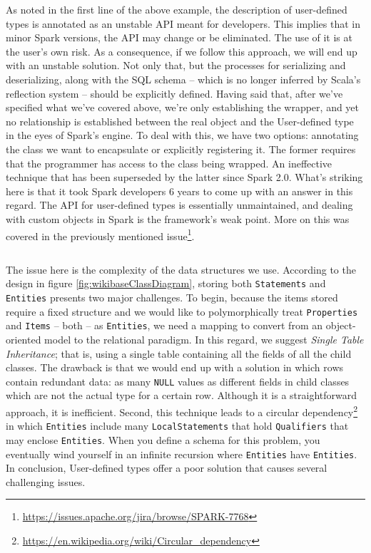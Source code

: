 As noted in the first line of the above example, the description of user-defined types is annotated as an unstable API meant for developers. This implies that in minor Spark versions, the API may change or be eliminated. The use of it is at the user's own risk. As a consequence, if we follow this approach, we will end up with an unstable solution. Not only that, but the processes for serializing and deserializing, along with the SQL schema -- which is no longer inferred by Scala's reflection system -- should be explicitly defined. Having said that, after we've specified what we've covered above, we're only establishing the wrapper, and yet no relationship is established between the real object and the User-defined type in the eyes of Spark's engine. To deal with this, we have two options: annotating the class we want to encapsulate or explicitly registering it. The former requires that the programmer has access to the class being wrapped. An ineffective technique that has been superseded by the latter since Spark 2.0. What's striking here is that it took Spark developers 6 years to come up with an answer in this regard. The API for user-defined types is essentially unmaintained, and dealing with custom objects in Spark is the framework's weak point. More on this was covered in the previously mentioned issue\footnote{\url{https://issues.apache.org/jira/browse/SPARK-7768}}.

\begin{code}
    \inputminted{scala}{code/listings/8-2_udtRegistration.scala}
\end{code}

The issue here is the complexity of the data structures we use. According to the design in figure \ref{fig:wikibaseClassDiagram}, storing both \texttt{Statements} and \texttt{Entities} presents two major challenges. To begin, because the items stored require a fixed structure and we would like to polymorphically treat \texttt{Properties} and \texttt{Items} -- both -- as \texttt{Entities}, we need a mapping to convert from an object-oriented model to the relational paradigm. In this regard, we suggest \textit{Single Table Inheritance}; that is, using a single table containing all the fields of all the child classes. The drawback is that we would end up with a solution in which rows contain redundant data: as many \texttt{NULL} values as different fields in child classes which are not the actual type for a certain row. Although it is a straightforward approach, it is inefficient. Second, this technique leads to a circular dependency\footnote{\url{https://en.wikipedia.org/wiki/Circular_dependency}} in which \texttt{Entities} include many \texttt{LocalStatements} that hold \texttt{Qualifiers} that may enclose \texttt{Entities}. When you define a schema for this problem, you eventually wind yourself in an infinite recursion where \texttt{Entities} have \texttt{Entities}. In conclusion, User-defined types offer a poor solution that causes several challenging issues.

